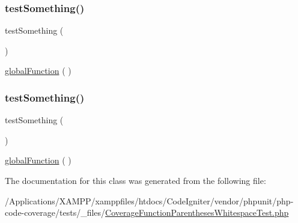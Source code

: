 \subsubsection{\texorpdfstring{test\+Something()}{testSomething()}\hspace{0.1cm}{\footnotesize\ttfamily [1/2]}}
{\footnotesize\ttfamily test\+Something (\begin{DoxyParamCaption}{ }\end{DoxyParamCaption})}

\mbox{\hyperlink{phpunit_2tests_2__files_2_covered_function_8php_a321be2fcdead5148a9cc7794f56f08ad}{global\+Function}} ( ) \mbox{\label{class_coverage_function_parentheses_whitespace_test_a0fc4e17369bc9607ebdd850d9eda8167}} 
\subsubsection{\texorpdfstring{test\+Something()}{testSomething()}\hspace{0.1cm}{\footnotesize\ttfamily [2/2]}}
{\footnotesize\ttfamily test\+Something (\begin{DoxyParamCaption}{ }\end{DoxyParamCaption})}

\mbox{\hyperlink{phpunit_2tests_2__files_2_covered_function_8php_a321be2fcdead5148a9cc7794f56f08ad}{global\+Function}} ( ) 

The documentation for this class was generated from the following file\+:\begin{DoxyCompactItemize}
\item 
/\+Applications/\+X\+A\+M\+P\+P/xamppfiles/htdocs/\+Code\+Igniter/vendor/phpunit/php-\/code-\/coverage/tests/\+\_\+files/\mbox{\hyperlink{php-code-coverage_2tests_2__files_2_coverage_function_parentheses_whitespace_test_8php}{Coverage\+Function\+Parentheses\+Whitespace\+Test.\+php}}\end{DoxyCompactItemize}
